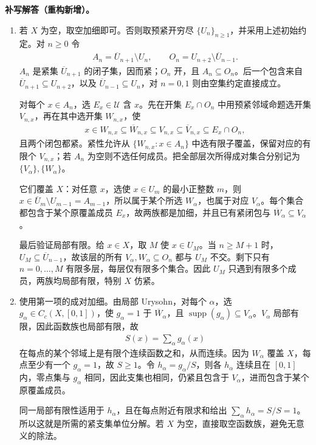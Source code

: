 \documentclass[../../main.tex]{subfiles}%
\begin{document}
\begin{solution}
\textbf{补写解答（重构新增）。}
\begin{enumerate}
\item 若 $X$ 为空，取空加细即可。否则取预紧开穷尽 $\{U_n\}_{n\ge1}$，并采用上述初始约定。对 $n\ge0$ 令
\begin{align*}
A_n=\overline U_{n+1}\setminus U_n,\qquad
O_n=U_{n+2}\setminus\overline U_{n-1}.
\end{align*}
$A_n$ 是紧集 $\overline U_{n+1}$ 的闭子集，因而紧；$O_n$ 开，且 $A_n\subseteq O_n$。后一个包含来自 $\overline U_{n+1}\subseteq U_{n+2}$，以及 $\overline U_{n-1}\subseteq U_n$，对 $n=0,1$ 则由空集约定直接成立。

对每个 $x\in A_n$，选 $E_x\in\mathcal U$ 含 $x$。先在开集 $E_x\cap O_n$ 中用预紧邻域命题选开集 $V_{n,x}$，再在其中选开集 $W_{n,x}$，使
\begin{align*}
x\in W_{n,x}\subseteq\overline W_{n,x}\subseteq V_{n,x}
\subseteq\overline V_{n,x}\subseteq E_x\cap O_n,
\end{align*}
且两个闭包都紧。紧性允许从 $\{W_{n,x}:x\in A_n\}$ 中选有限子覆盖，保留对应的有限个 $V_{n,x}$；若 $A_n$ 为空则不选任何成员。把全部层次所得成对集合分别记为 $\{V_\alpha\},\{W_\alpha\}$。

它们覆盖 $X$：对任意 $x$，选使 $x\in U_m$ 的最小正整数 $m$，则 $x\in\overline U_m\setminus U_{m-1}=A_{m-1}$，所以属于某个所选 $W_\alpha$，也属于对应 $V_\alpha$。每个集合都包含于某个原覆盖成员 $E_x$，故两族都是加细，并且已有紧闭包与 $\overline W_\alpha\subseteq V_\alpha$。

最后验证局部有限。给 $x\in X$，取 $M$ 使 $x\in U_M$。当 $n\ge M+1$ 时，$U_M\subseteq\overline U_{n-1}$，故该层的所有 $V_\alpha,W_\alpha\subseteq O_n$ 都与 $U_M$ 不交。剩下只有 $n=0,\ldots,M$ 有限多层，每层仅有限多个集合。因此 $U_M$ 只遇到有限多个成员，两族均局部有限，特别 $X$ 仿紧。
\item 使用第一项的成对加细。由局部 Urysohn，对每个 $\alpha$，选 $g_\alpha\in C_c(X,[0,1])$，使 $g_\alpha=1$ 于 $\overline W_\alpha$，且 $\operatorname{supp}(g_\alpha)\subseteq V_\alpha$。$V_\alpha$ 局部有限，因此函数族也局部有限，故
\begin{align*}
S(x)=\sum_\alpha g_\alpha(x)
\end{align*}
在每点的某个邻域上是有限个连续函数之和，从而连续。因为 $W_\alpha$ 覆盖 $X$，每点至少有一个 $g_\alpha=1$，故 $S\ge1$。令 $h_\alpha=g_\alpha/S$，则各 $h_\alpha$ 连续且在 $[0,1]$ 内，零点集与 $g_\alpha$ 相同，因此支集也相同，仍紧且包含于 $V_\alpha$，进而包含于某个原覆盖成员。

同一局部有限性适用于 $h_\alpha$，且在每点附近有限求和给出 $\sum_\alpha h_\alpha=S/S=1$。所以这就是所需的紧支集单位分解。若 $X$ 为空，直接取空函数族，避免无意义的除法。
\end{enumerate}
\end{solution}
\end{document}
